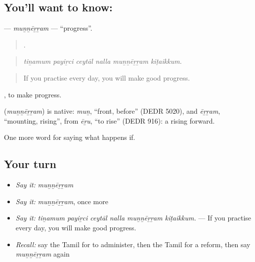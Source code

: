 \subsection*{You'll want to know: }
\textbf{} — \emph{muṉṉēṟṟam} — \textquotedblleft{}progress\textquotedblright{}.

\begin{quote}
     .
\end{quote}

\begin{quote}
\emph{tiṉamum payiṟci ceytāl nalla muṉṉēṟṟam kiṭaikkum.}
\end{quote}

\begin{quote}
If you practise every day, you will make good progress.
\end{quote}

 , to make progress.

\begin{cousinweb}
\textbf{} (\emph{muṉṉēṟṟam}) is native: \emph{muṉ}, \textquotedblleft{}front, before\textquotedblright{} (DEDR 5020), and \emph{ēṟṟam}, \textquotedblleft{}mounting, rising\textquotedblright{}, from \emph{ēṟu}, \textquotedblleft{}to rise\textquotedblright{} (DEDR 916): a rising forward.
\end{cousinweb}

\begin{grammarlens}[title={What you've built}]
One more word for saying what happens if.
\end{grammarlens}

\subsection*{Your turn}
\begin{itemize}
\raggedright
  \item \emph{Say it:} \emph{muṉṉēṟṟam}
  \item \emph{Say it:} \emph{muṉṉēṟṟam}, once more
  \item \emph{Say it:} \emph{tiṉamum payiṟci ceytāl nalla muṉṉēṟṟam kiṭaikkum.} — If you practise every day, you will make good progress.
  \item \emph{Recall:} say the Tamil for to administer, then the Tamil for a reform, then say \emph{muṉṉēṟṟam} again
\end{itemize}

